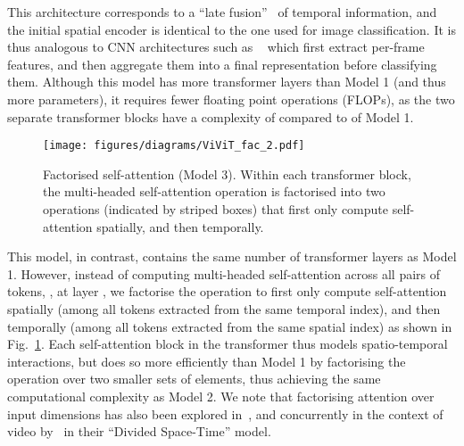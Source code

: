 \documentclass[10pt,twocolumn,letterpaper]{article}
\makeatletter
\renewcommand{\paragraph}{\@startsection{paragraph}{4}{\z@}{1.625ex \@plus 1ex \@minus .2ex}{-1em}{\normalfont\normalsize\bfseries}}
\makeatother
\begin{document}
This architecture corresponds to a ``late fusion''~\cite{karpathy_cvpr_2014, simonyan_neurips_2014, wang_tsn_eccv_2016, neimark_arxiv_2021} of temporal information, and the initial spatial encoder is identical to the one used for image classification.
It is thus analogous to CNN architectures such as ~\cite{girdhar_neurips_2017, karpathy_cvpr_2014, wang_tsn_eccv_2016, zhou_trn_eccv_2018} which first extract per-frame features, and then aggregate them into a final representation before classifying them. Although this model has more transformer layers than Model 1 (and thus more parameters), it requires fewer floating point operations (FLOPs), as the two separate transformer blocks have a complexity of  compared to  of Model 1.


\paragraph{Model 3: Factorised self-attention}
\begin{figure}
    \vspace{-0.5\baselineskip}
    \centering
    \texttt{[image: figures/diagrams/ViViT\_fac\_2.pdf]}
        \vspace{0.1em}
        \caption{ 
    	Factorised self-attention (Model 3).
    	Within each transformer block, the multi-headed self-attention operation is factorised into two operations (indicated by striped boxes) that first only compute self-attention spatially, and then temporally.
    }
    \label{fig:factorised_self_attention}
    \vspace{-\baselineskip}
\end{figure} 
This model, in contrast, contains the same number of transformer layers as Model 1.
However, instead of computing multi-headed self-attention across all pairs of tokens, , at layer , we factorise the operation to first only compute self-attention spatially (among all tokens extracted from the same temporal index), and then temporally (among all tokens extracted from the same spatial index) as shown in Fig.~\ref{fig:factorised_self_attention}.
Each self-attention block in the transformer thus models spatio-temporal interactions, but does so more efficiently than Model 1 by factorising the operation over two smaller sets of elements, thus achieving the same computational complexity as Model 2. We note that factorising attention over input dimensions has also been explored in~\cite{ho_arxiv_2019, weissenborn_iclr_2020}, and concurrently in the context of video by~\cite{bertasius_arxiv_2021} in their ``Divided Space-Time'' model.
\end{document}
